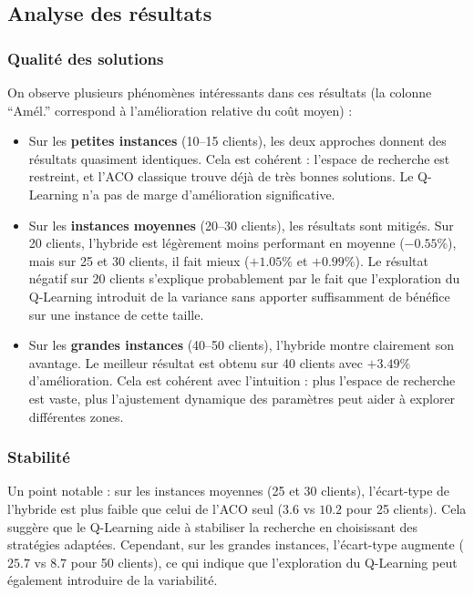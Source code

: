 \documentclass[12pt, a4paper]{article}
\begin{document}
\subsection{Analyse des résultats}

\subsubsection{Qualité des solutions}

On observe plusieurs phénomènes intéressants dans ces résultats (la colonne ``Amél.'' correspond à l'amélioration relative du coût moyen) :

\begin{itemize}
    \item Sur les \textbf{petites instances} (10--15 clients), les deux approches donnent des résultats quasiment identiques. Cela est cohérent : l'espace de recherche est restreint, et l'ACO classique trouve déjà de très bonnes solutions. Le Q-Learning n'a pas de marge d'amélioration significative.

    \item Sur les \textbf{instances moyennes} (20--30 clients), les résultats sont mitigés. Sur 20 clients, l'hybride est légèrement moins performant en moyenne ($-0.55\%$), mais sur 25 et 30 clients, il fait mieux ($+1.05\%$ et $+0.99\%$). Le résultat négatif sur 20 clients s'explique probablement par le fait que l'exploration du Q-Learning introduit de la variance sans apporter suffisamment de bénéfice sur une instance de cette taille.

    \item Sur les \textbf{grandes instances} (40--50 clients), l'hybride montre clairement son avantage. Le meilleur résultat est obtenu sur 40 clients avec $+3.49\%$ d'amélioration. Cela est cohérent avec l'intuition : plus l'espace de recherche est vaste, plus l'ajustement dynamique des paramètres peut aider à explorer différentes zones.
\end{itemize}

\subsubsection{Stabilité}

Un point notable : sur les instances moyennes (25 et 30 clients), l'écart-type de l'hybride est plus faible que celui de l'ACO seul ($3.6$ vs $10.2$ pour 25 clients). Cela suggère que le Q-Learning aide à stabiliser la recherche en choisissant des stratégies adaptées. Cependant, sur les grandes instances, l'écart-type augmente ($25.7$ vs $8.7$ pour 50 clients), ce qui indique que l'exploration du Q-Learning peut également introduire de la variabilité.
\end{document}
